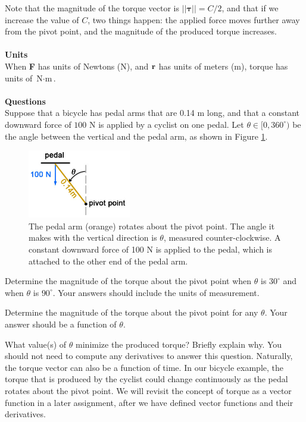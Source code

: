 Note that the magnitude of the torque vector is $||\boldsymbol\tau|| = C/2$, and that if we increase the value of $C$, two things happen: the applied force moves further away from the pivot point, and the magnitude of the produced torque increases. \\\\
\textbf{Units}\\
When \textbf{F} has units of Newtons (N), and $\mathbf{r}$ has units of meters (m), torque has units of $\text{N}\cdot\text{m}$.\\\\
\textbf{Questions}\\
Suppose that a bicycle has pedal arms that are 0.14 m long, and that a constant downward force of $100 \text{ N}$ is applied by a cyclist on one pedal.  Let $\theta \in [0,360^{\circ})$ be the angle between the vertical and the pedal arm, as shown in Figure \ref{FigCycle}. 
\begin{figure}[H]
  \begin{center}
    \includegraphics[width=0.4\textwidth]{ImgBicycle.jpg}
      \caption{\small{The pedal arm (orange) rotates about the pivot point. The angle it makes with the vertical direction is $\theta$, measured counter-clockwise. A constant downward force of 100 N is applied to the pedal, which is attached to the other end of the pedal arm.\label{FigCycle} }}
  \end{center}
\end{figure}
\BEN
  \item Determine the magnitude of the torque about the pivot point when $\theta$ is $30^{\circ}$ and when $\theta$ is $90^{\circ}$. Your answers should include the units of measurement. 
  \item Determine the magnitude of the torque about the pivot point for any $\theta$. Your answer should be a function of $\theta$.  
  \item What value(s) of $\theta$ minimize the produced torque? Briefly explain why. You should not need to compute any derivatives to answer this question. 
\EEN
Naturally, the torque vector can also be a function of time. In our bicycle example, the torque that is produced by the cyclist could change continuously as the pedal rotates about the pivot point. We will revisit the concept of torque as a vector function in a later assignment, after we have defined vector functions and their derivatives. 

